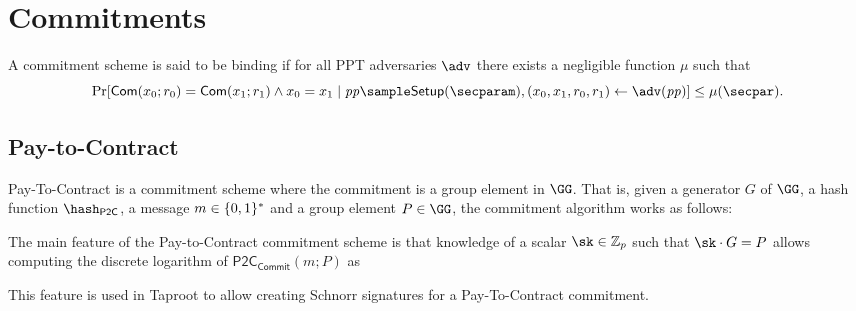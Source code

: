 \section{Commitments}

\begin{definition}
A commitment scheme is said to be binding if for all PPT adversaries $\adv$ there exists a negligible function $\mu$ such that
\begin{equation*}
\Pr[\com(x_0; r_0) = \com(x_1; r_1) \wedge x_0 = x_1 \mid \params \sample \setup(\secparam), (x_0, x_1, r_0, r_1) \gets \adv(\params)] \le \mu(\secpar).
\end{equation*}
\end{definition}

\subsection{Pay-to-Contract}

Pay-To-Contract is a commitment scheme where the commitment is a group element in $\GG$.
That is, given a generator $G$ of $\GG$, a hash function $\HPTOC$, a message $m \in \{0,1\}^*$ and a group element $P \in \GG$, the commitment algorithm works as follows:


The main feature of the Pay-to-Contract commitment scheme is that knowledge of a scalar $\sk \in \Z_p$ such that $\sk \cdot G = P$ allows computing the discrete logarithm of $\mathsf{P2C}_\mathsf{Commit}(m; P)$ as


This feature is used in Taproot to allow creating Schnorr signatures for a Pay-To-Contract commitment.

